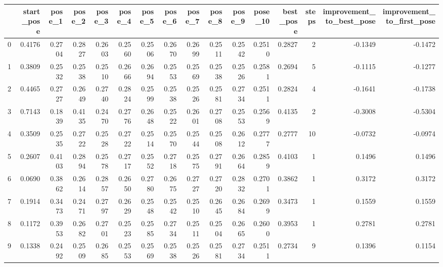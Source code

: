 \begin{tabular}{lrrrrrrrrrrrrrrr}
\toprule
{} &  start\_pose &  pose\_1 &  pose\_2 &  pose\_3 &  pose\_4 &  pose\_5 &  pose\_6 &  pose\_7 &  pose\_8 &  pose\_9 &  pose\_10 &  best\_pose &  steps &  improvement\_to\_best\_pose &  improvement\_to\_first\_pose \\
\midrule
0   &      0.4176 &  0.2704 &  0.2827 &  0.2603 &  0.2560 &  0.2506 &  0.2670 &  0.2699 &  0.2511 &  0.2542 &   0.2510 &     0.2827 &      2 &                   -0.1349 &                    -0.1472 \\
1   &      0.3809 &  0.2532 &  0.2538 &  0.2510 &  0.2666 &  0.2694 &  0.2553 &  0.2569 &  0.2538 &  0.2526 &   0.2581 &     0.2694 &      5 &                   -0.1115 &                    -0.1277 \\
2   &      0.4465 &  0.2727 &  0.2649 &  0.2740 &  0.2824 &  0.2599 &  0.2538 &  0.2526 &  0.2581 &  0.2734 &   0.2511 &     0.2824 &      4 &                   -0.1641 &                    -0.1738 \\
3   &      0.7143 &  0.1839 &  0.4135 &  0.2470 &  0.2776 &  0.2648 &  0.2522 &  0.2601 &  0.2708 &  0.2553 &   0.2569 &     0.4135 &      2 &                   -0.3008 &                    -0.5304 \\
4   &      0.3509 &  0.2535 &  0.2722 &  0.2528 &  0.2722 &  0.2514 &  0.2570 &  0.2544 &  0.2508 &  0.2612 &   0.2777 &     0.2777 &     10 &                   -0.0732 &                    -0.0974 \\
5   &      0.2607 &  0.4103 &  0.2894 &  0.2578 &  0.2717 &  0.2552 &  0.2718 &  0.2575 &  0.2791 &  0.2664 &   0.2859 &     0.4103 &      1 &                    0.1496 &                     0.1496 \\
6   &      0.0690 &  0.3862 &  0.2614 &  0.2857 &  0.2650 &  0.2780 &  0.2675 &  0.2727 &  0.2720 &  0.2832 &   0.2701 &     0.3862 &      1 &                    0.3172 &                     0.3172 \\
7   &      0.1914 &  0.3473 &  0.2471 &  0.2797 &  0.2629 &  0.2548 &  0.2542 &  0.2510 &  0.2645 &  0.2684 &   0.2699 &     0.3473 &      1 &                    0.1559 &                     0.1559 \\
8   &      0.1172 &  0.3953 &  0.2682 &  0.2701 &  0.2523 &  0.2585 &  0.2734 &  0.2511 &  0.2504 &  0.2665 &   0.2600 &     0.3953 &      1 &                    0.2781 &                     0.2781 \\
9   &      0.1338 &  0.2492 &  0.2509 &  0.2685 &  0.2553 &  0.2569 &  0.2538 &  0.2526 &  0.2581 &  0.2734 &   0.2511 &     0.2734 &      9 &                    0.1396 &                     0.1154 \\

\end{tabular}
